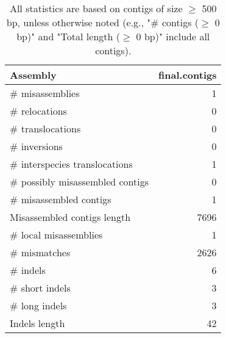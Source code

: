 \documentclass[12pt,a4paper]{article}
\begin{document}
\begin{table}[ht]
\begin{center}
\caption{All statistics are based on contigs of size $\geq$ 500 bp, unless otherwise noted (e.g., "\# contigs ($\geq$ 0 bp)" and "Total length ($\geq$ 0 bp)" include all contigs).}
\begin{tabular}{|l*{1}{|r}|}
\hline
Assembly & final.contigs \\ \hline
\# misassemblies & 1 \\ \hline
\hspace{5mm}\# relocations & 0 \\ \hline
\hspace{5mm}\# translocations & 0 \\ \hline
\hspace{5mm}\# inversions & 0 \\ \hline
\hspace{5mm}\# interspecies translocations & 1 \\ \hline
\# possibly misassembled contigs & 0 \\ \hline
\# misassembled contigs & 1 \\ \hline
Misassembled contigs length & 7696 \\ \hline
\# local misassemblies & 1 \\ \hline
\# mismatches & 2626 \\ \hline
\# indels & 6 \\ \hline
\hspace{5mm}\# short indels & 3 \\ \hline
\hspace{5mm}\# long indels & 3 \\ \hline
Indels length & 42 \\ \hline
\end{tabular}
\end{center}
\end{table}
\end{document}
